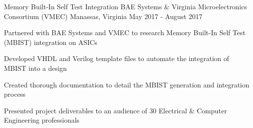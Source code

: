 \begin{cventries}

\cventry
{Memory Built-In Self Test Integration} %
{BAE Systems \& Virginia Microelectronics Consortium (VMEC)} %
{Manassas, Virginia} %
{May 2017 - August 2017} %
{ %
\begin{cvitems}
\item {Partnered with BAE Systems and VMEC to research Memory Built-In Self Test (MBIST) integration on ASICs}
\item {Developed VHDL and Verilog template files to automate the integration of MBIST into a design}
\item {Created thorough documentation to detail the MBIST generation and integration process}
\item {Presented project deliverables to an audience of 30 Electrical \& Computer Engineering professionals}
\end{cvitems}
}




\end{cventries}